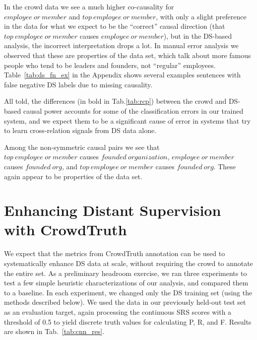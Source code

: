 In the crowd data we see a much higher co-causality for \\ $employee\ or\ member$ and $top\ employee\ or\ member$, with only a slight preference in the data for what we expect to be the ``correct'' causal direction (that $top\ employee\ or\ member$ causes $employee\ or\ member$), but in the DS-based analysis, the incorrect interpretation drops a lot. In manual error analysis we observed that these are properties of the data set, which talk about more famous people who tend to be leaders and founders, not ``regular'' employees.  Table~\ref{tab:ds_fn_ex} in the Appendix shows several examples sentences with false negative DS labels due to missing causality.

All told, the differences (in bold in Tab.\ref{tab:rcp}) between the crowd and DS-based causal power accounts for some of the classification errors in our trained system, and we expect them to be a significant cause of error in systems that try to learn cross-relation signals from DS data alone.

Among the non-symmetric causal pairs we see that \\ $top\ employee\ or\ member$ causes $founded\ organization$, $employee\ or\ member$ causes $founded\ org$, and $top\ employee\ or\ member$ causes $founded\ org$.  These again appear to be properties of the data set.


\section{Enhancing Distant Supervision with CrowdTruth}
We expect that the metrics from CrowdTruth annotation can be used to systematically enhance DS data at scale, without requiring the crowd to annotate the entire set.  As a preliminary headroom exercise, we ran three experiments to test a few simple heuristic characterizations of our analysis, and compared them to a baseline.  In each experiment, we changed only the DS training set (using the methods described below).  We used the data in our previously held-out test set as an evaluation target, again processing the continuous SRS scores with a threshold of 0.5 to yield discrete truth values for calculating P, R, and F.  Results are shown in Tab.~\ref{tab:cnn_res}.

